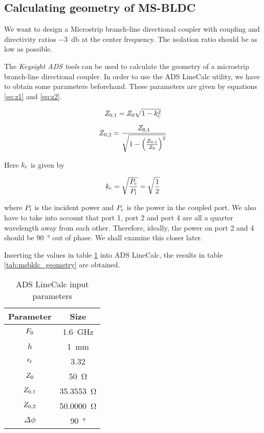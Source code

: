 \subsection{Calculating geometry of MS-BLDC}

We want to design a Microstrip branch-line directional coupler with coupling and directivity ratios \SI{-3}{\decibel} at the center frequency.
The isolation ratio should be as low as possible.

The \emph{Keysight ADS tools} can be used to calculate the geometry of a microstrip branch-line directional coupler.
In order to use the ADS LineCalc utility, we have to obtain some parameters beforehand.
These parameters are given by equations \ref{eq:z1} and \ref{eq:z2}.

\begin{equation}
Z_{\rm 0,1} = Z_{\rm 0} \sqrt{1 - k_{\rm c}^{2}}
\label{eq:z1}
\end{equation}

\begin{equation}
Z_{\rm 0,2} = \frac{Z_{\rm 0,1}} {\sqrt{1 - \left( \frac{Z_{\rm 0,1}}{Z_{\rm 0}} \right)^2}}
\label{eq:z2}
\end{equation}

Here $k_{\rm c}$ is given by

\begin{equation}
k_{\rm c} = \sqrt{\frac{P_{\rm c}}{P_{\rm i}}} = \sqrt{\frac{1}{2}}
\end{equation}

where $P_{\rm i}$ is the incident power and $P_{\rm c}$ is the power in the coupled port.
We also have to take into account that port 1, port 2 and port 4 are all a quarter wavelength away from each other.
Therefore, ideally, the power on port 2 and 4 should be \SI{90}{\degree} out of phase.
We shall examine this closer later. \par

Inserting the values in table \ref{tab:linecalc} into  ADS LineCalc, the results in table \ref{tab:msbldc_geometry} are obtained.

\begin{table}[h t b p]
\centering
\caption{ADS LineCalc input parameters}
\begin{tabular}{|c|c|} \hline
Parameter & Size \\ \hline
$F_{\rm 0}$  & \SI{1.6}{\giga\hertz} \\
$h$ & \SI{1}{\milli\meter} \\
$\epsilon_{\rm r}$ & 3.32 \\
$Z_{\rm 0}$ & \SI{50}{\ohm} \\
$Z_{\rm 0,1}$ & \SI{35.3553}{\ohm} \\
$Z_{\rm 0,2}$ & \SI{50.0000}{\ohm} \\
$\Delta \phi$ & \SI{90}{\degree} \\
\hline
\end{tabular}
\label{tab:linecalc}
\end{table}

